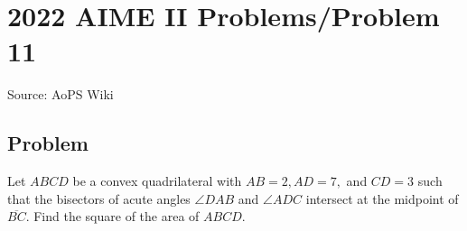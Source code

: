 \documentclass[12pt]{article}
\begin{document}
\section*{{2022 AIME II Problems/Problem 11}}
Source: AoPS Wiki

\subsection*{Problem}
Let $ABCD$ be a convex quadrilateral with $AB=2, AD=7,$ and $CD=3$ such that the bisectors of acute angles $\angle{DAB}$ and $\angle{ADC}$ intersect at the midpoint of $\overline{BC}.$ Find the square of the area of $ABCD.$
\end{document}
